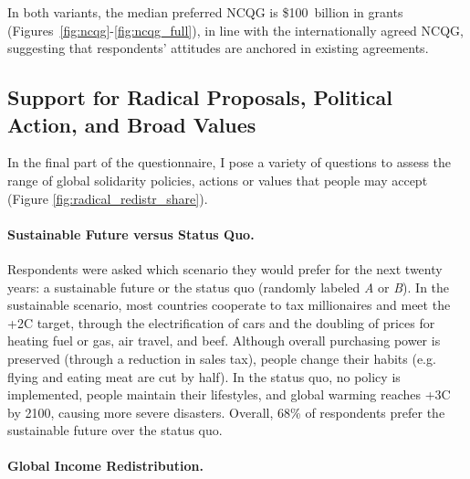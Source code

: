 \documentclass[12pt,english]{article}
\begin{document}
\begin{bibunit}
In both variants, the median preferred NCQG is \$100~billion in grants %
(Figures~\ref{fig:ncqg}-\ref{fig:ncqg_full}),
in line with the internationally agreed NCQG, suggesting that respondents' attitudes are anchored in existing agreements. %

\subsection{Support for Radical Proposals, Political Action, and Broad Values}\label{subsec:radical}

In the final part of the questionnaire, I pose a variety of questions to assess the range of global solidarity policies, actions or values that people may accept (Figure \ref{fig:radical_redistr_share}).

\paragraph{Sustainable Future versus Status Quo.}\label{par:sustainable_future}

Respondents were asked which scenario they would prefer for the next twenty years: a sustainable future or the status quo (randomly labeled \textit{A} or \textit{B}). In the sustainable scenario, most countries cooperate to tax millionaires and meet the +2\textdegree{}C target, through the electrification of cars and the doubling of prices for heating fuel or gas, air travel, and beef. Although overall purchasing power is preserved (through a reduction in sales tax), people change their habits (e.g. flying and eating meat are cut by half). In the status quo, no policy is implemented, people maintain their lifestyles, and global warming reaches +3\textdegree{}C by 2100, causing more severe disasters. Overall, 68\% of respondents prefer the sustainable future over the status quo.

\paragraph{Global Income Redistribution.}\label{par:global_income_redistr}


\end{bibunit}
\end{document}
